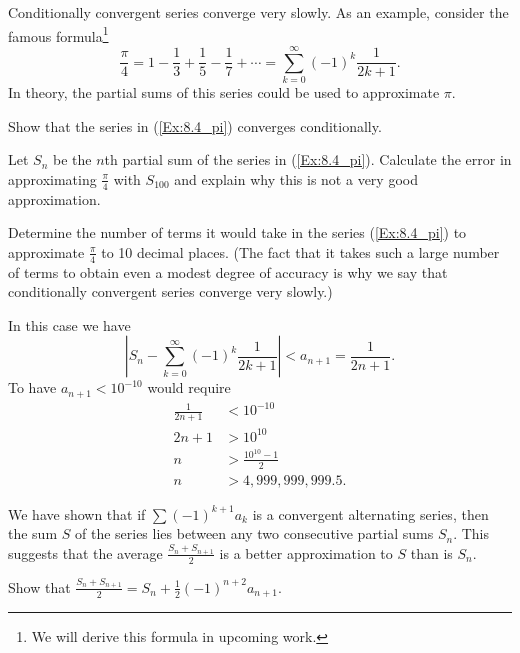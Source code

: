 \begin{exercises}
\item Conditionally convergent series converge very slowly. As an example, consider the famous formula\footnote{We will derive this formula in upcoming work.}
\begin{equation} \label{Ex:8.4_pi}
\frac{\pi}{4} = 1 - \frac{1}{3} + \frac{1}{5} - \frac{1}{7} + \cdots = \sum_{k=0}^{\infty} (-1)^{k} \frac{1}{2k+1}.
\end{equation}
 In theory, the partial sums of this series could be used to approximate $\pi$.
    \ba
    \item Show that the series in (\ref{Ex:8.4_pi}) converges conditionally.

    \item Let $S_n$ be the $n$th partial sum of the series in (\ref{Ex:8.4_pi}). Calculate the error in approximating $\frac{\pi}{4}$ with $S_{100}$ and explain why this is not a very good approximation.

    \item Determine the number of terms it would take in the series (\ref{Ex:8.4_pi}) to approximate $\frac{\pi}{4}$ to 10 decimal places. (The fact that it takes such a large number of terms to obtain even a modest degree of accuracy is why we say that conditionally convergent series converge very slowly.)

\begin{exerciseSolution}

In this case we have
\[|S_n - \sum_{k=0}^{\infty} (-1)^{k} \frac{1}{2k+1}| < a_{n+1} = \frac{1}{2n+1}.\]
To have $a_{n+1} < 10^{-10}$ would require
\begin{align*}
\frac{1}{2n+1} &< 10^{-10} \\
2n+1 &> 10^{10} \\
n &> \frac{10^{10}-1}{2} \\
n &> 4,999,999,999.5.
\end{align*}
\end{exerciseSolution}

    \ea

\item We have shown that if $\sum (-1)^{k+1} a_k$ is a convergent alternating series, then the sum $S$ of the series lies between any two consecutive partial sums $S_n$. This suggests that the average $\frac{S_n+S_{n+1}}{2}$
    is a better approximation to $S$ than is $S_n$.
    \ba
    \item Show that $\frac{S_n+S_{n+1}}{2} = S_n + \frac{1}{2}(-1)^{n+2} a_{n+1}$.


\end{exercises}
